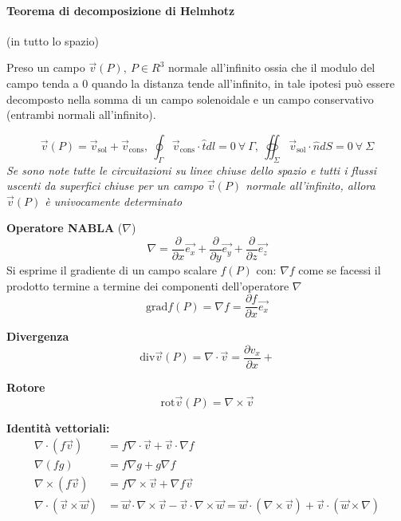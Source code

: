 \paragraph{Teorema di decomposizione di Helmhotz} (in tutto lo spazio)

Preso un campo $\vec{v}(P),\ P \in R^3$ normale all'infinito ossia che il modulo del campo tenda
a 0 quando la distanza tende all'infinito, in tale ipotesi può essere decomposto nella somma
di un campo solenoidale e un campo conservativo (entrambi normali all'infinito).

$$
\vec{v}(P) = \vec{v}_\text{sol} + \vec{v}_\text{cons},\ 
\oint_{\Gamma}\vec{v}_\text{cons}\cdot\hat{t} dl = 0\ \forall\ \Gamma,\ \oiint_{\Sigma}
\vec{v}_\text{sol}\cdot\hat{n}dS = 0\ \forall\ \Sigma 
$$
\textit{Se sono note tutte le circuitazioni su linee chiuse dello spazio e tutti i flussi uscenti da
superfici chiuse per un campo $\vec{v}(P)$ normale all'infinito, allora $\vec{v}(P)$ è univocamente
determinato}

\textbf{Operatore NABLA} ($\nabla$)
$$
\nabla = \frac{\partial}{\partial x}\vec{e_x} + \frac{\partial}{\partial y}\vec{e_y} + \frac{\partial}{\partial z}\vec{e_z}
$$
Si esprime il gradiente di un campo scalare $f(P)$ con: $\nabla f$ come se facessi il prodotto
termine a termine dei componenti dell'operatore $\nabla$
$$
\text{grad} f(P) = \nabla f = \frac{\partial f}{\partial x}\vec{e_x}
$$

\textbf{Divergenza}
$$
\text{div}\vec{v}(P) = \nabla\cdot\vec{v} = \frac{\partial v_x}{\partial x} + 
$$

\textbf{Rotore}
$$
\text{rot}\vec{v}(P) = \nabla \times \vec{v}
$$

\textbf{Identità vettoriali:}
\begin{align*}
\nabla\cdot(f\vec{v}) &= f\nabla\cdot\vec{v} + \vec{v}\cdot \nabla f \\
\nabla(f g) &= f\nabla g + g\nabla f \\
\nabla \times (f\vec{v}) &= f\nabla\times\vec{v} + \nabla f \vec{v} \\
\nabla\cdot (\vec{v}\times\vec{w}) &= \vec{w}\cdot\nabla\times\vec{v} - \vec{v}\cdot\nabla\times\vec{w}
= \vec{w}\cdot(\nabla\times\vec{v}) + \vec{v}\cdot (\vec{w}\times\nabla)
\end{align*}

